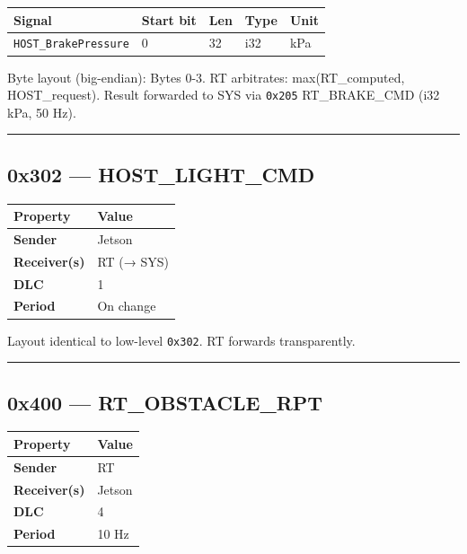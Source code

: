 \documentclass[12pt,a4paper,oneside]{report}
\begin{document}
\begin{longtable}[]{@{}lllll@{}}
\toprule\noalign{}
Signal & Start bit & Len & Type & Unit \\
\midrule\noalign{}
\endhead
\bottomrule\noalign{}
\endlastfoot
\texttt{HOST\_BrakePressure} & 0 & 32 & i32 & kPa \\
\end{longtable}

Byte layout (big-endian): Bytes 0-3. RT arbitrates: max(RT\_computed,
HOST\_request). Result forwarded to SYS via \texttt{0x205} RT\_BRAKE\_CMD (i32
kPa, 50 Hz).

\begin{center}\rule{0.5\linewidth}{0.5pt}\end{center}

\subsection{0x302 --- HOST\_LIGHT\_CMD}\label{x302-host_light_cmd}

\begin{longtable}[]{@{}ll@{}}
\toprule\noalign{}
Property & Value \\
\midrule\noalign{}
\endhead
\bottomrule\noalign{}
\endlastfoot
\textbf{Sender} & Jetson \\
\textbf{Receiver(s)} & RT (→ SYS) \\
\textbf{DLC} & 1 \\
\textbf{Period} & On change \\
\end{longtable}

Layout identical to low-level \texttt{0x302}. RT forwards transparently.

\begin{center}\rule{0.5\linewidth}{0.5pt}\end{center}

\subsection{0x400 --- RT\_OBSTACLE\_RPT}\label{x400-rt_obstacle_rpt}

\begin{longtable}[]{@{}ll@{}}
\toprule\noalign{}
Property & Value \\
\midrule\noalign{}
\endhead
\bottomrule\noalign{}
\endlastfoot
\textbf{Sender} & RT \\
\textbf{Receiver(s)} & Jetson \\
\textbf{DLC} & 4 \\
\textbf{Period} & 10 Hz \\
\end{longtable}
\end{document}
